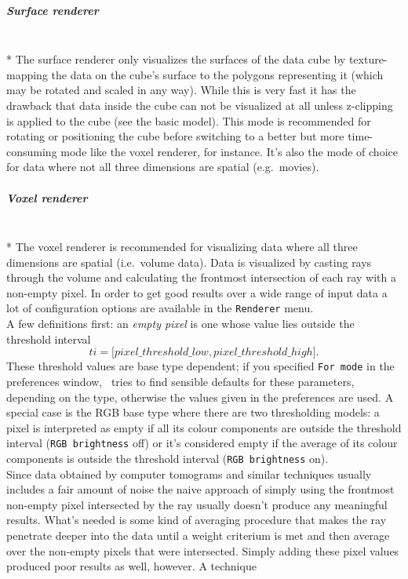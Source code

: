 \documentclass[11pt]{article}
\begin{document}
\subparagraph{Surface renderer} \noindent \label{SurfaceRenderer}
\ \\*
The surface renderer only visualizes the surfaces of the data cube by texture-mapping
the data on the cube's surface to the polygons representing it (which may be
rotated and scaled in any way). While this is very fast it has the drawback that
data inside the cube can not be visualized at all unless z-clipping is applied
to the cube (see the basic model). This mode is recommended for rotating or
positioning the cube before switching to a better but more time-consuming
mode like the voxel renderer, for instance. It's also the mode of choice for
data where not all three dimensions are spatial (e.g.\ movies).

\subparagraph{Voxel renderer} \noindent \label{VoxelRenderer}
\ \\*
The voxel renderer is recommended for visualizing data where all three dimensions
are spatial (i.e.\ volume data). Data is visualized by casting rays through
the volume and calculating the frontmost intersection of each ray with a 
non-empty pixel. In order to get good results over a wide range of input
data a lot of configuration options are available in the \texttt{Renderer}
menu.\\
A few definitions first: an \emph{empty pixel} is one whose value lies outside
the threshold interval
$$ti = \lbrack pixel\_threshold\_low, pixel\_threshold\_high \rbrack .$$
These threshold values are base type dependent; if you specified \texttt{For mode}
in the preferences window, \rview\ tries to find sensible defaults for these
parameters, depending on the type, otherwise the values given in the preferences
are used. A special case is the RGB base type where there are two thresholding 
models: a pixel is interpreted as empty if all its colour components are outside
the threshold interval (\texttt{RGB brightness} off) or it's considered empty if the
average of its colour components is outside the threshold interval
(\texttt{RGB brightness} on).\\
Since data obtained by computer tomograms and similar techniques usually
includes a fair amount of noise the naive approach of simply using the
frontmost non-empty pixel intersected by the ray usually doesn't produce
any meaningful results. What's needed is some kind of averaging procedure that
makes the ray penetrate deeper into the data until a weight criterium is met
and then average over the non-empty pixels that were intersected. Simply
adding these pixel values produced poor results as well, however. A technique
\end{document}
